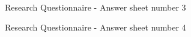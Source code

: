 \documentclass[a4paper]{article}
\begin{document}
\begin{appendices}
\begin{figure}[h!]
		\caption{Research Questionnaire - Answer sheet number 3}
	\end{figure}
	\newpage
	\begin{figure}[h!]
		\caption{Research Questionnaire - Answer sheet number 4}
	\end{figure}
	\newpage
	\begin{figure}[h!]

\end{figure}
\end{appendices}
\end{document}
